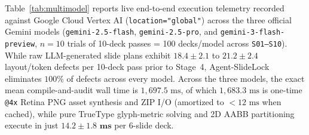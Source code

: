 \documentclass[10pt,journal,compsoc]{IEEEtran}
\begin{document}
Table~\ref{tab:multimodel} reports live end-to-end execution telemetry recorded against Google Cloud Vertex AI (\texttt{location="global"}) across the three official Gemini models (\texttt{gemini-2.5-flash}, \texttt{gemini-2.5-pro}, and \texttt{gemini-3-flash-preview}, $n=10$ trials of 10-deck passes = 100 decks/model across \texttt{S01--S10}). While raw LLM-generated slide plans exhibit $18.4 \pm 2.1$ to $21.2 \pm 2.4$ layout/token defects per 10-deck pass prior to Stage~4, Agent-SlideLock eliminates $100\%$ of defects across every model. Across the three models, the exact mean compile-and-audit wall time is $1{,}697.5\text{ ms}$, of which $1{,}683.3\text{ ms}$ is one-time \texttt{@4x} Retina PNG asset synthesis and ZIP I/O (amortized to $<12\text{ ms}$ when cached), while pure TrueType glyph-metric solving and 2D AABB partitioning execute in just $\mathbf{14.2 \pm 1.8\text{ ms}}$ per 6-slide deck.

\begin{table}[t]
\centering
\caption{Live Google Cloud Vertex AI Multi-Model Benchmark (\upshape\texttt{location="global"}, $n=10$ Trials of 10-Deck Passes = 100 Decks/Model)}
\label{tab:multimodel}
\renewcommand{\arraystretch}{1.12}
\end{table}
\end{document}

